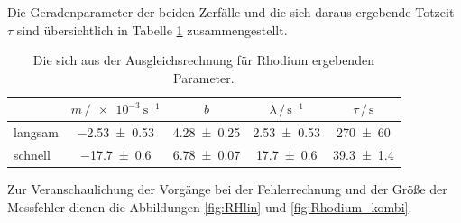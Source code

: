 Die Geradenparameter der beiden Zerfälle und die sich daraus ergebende Totzeit $\tau$ sind übersichtlich in Tabelle \ref{tab:Denkdirwasaus} zusammengestellt. 
\begin{table}
    \centering
    \caption{Die sich aus der Ausgleichsrechnung für Rhodium ergebenden Parameter.}
    \label{tab:Denkdirwasaus}
    \begin{tabular}{l c c c c}
        \toprule
         & $m\,/\SI{e-3}{\second\tothe{-1}}$ & $b$ & $\lambda\,/\,\si{\second\tothe{-1}}$ & $\tau\,/\,\si{\second}$ \\
        \midrule
        langsam & \num{-2.53+-0.53} & \num{4.28+-0.25} & \num{2.53+-0.53} & \num{270+-60}   \\
        schnell & \num{-17.7+-0.6}  & \num{6.78+-0.07} & \num{17.7+-0.6}  & \num{39.3+-1.4} \\
        \bottomrule
    \end{tabular}
\end{table}
Zur Veranschaulichung der Vorgänge bei der Fehlerrechnung und der Größe der Messfehler dienen die Abbildungen \ref{fig:RHlin} und \ref{fig:Rhodium_kombi}. 
